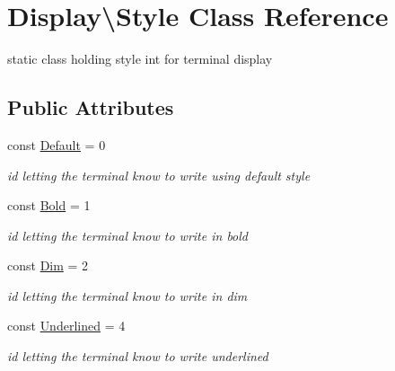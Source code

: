 \hypertarget{classDisplay_1_1Style}{}\section{Display\textbackslash{}Style Class Reference}
\label{classDisplay_1_1Style}


static class holding style int for terminal display  


\subsection*{Public Attributes}
\begin{DoxyCompactItemize}
\item 
\mbox{\label{classDisplay_1_1Style_a2c069acaa67c5efdd7821e4b2d71d472}} 
const \hyperlink{classDisplay_1_1Style_a2c069acaa67c5efdd7821e4b2d71d472}{Default} = 0
\begin{DoxyCompactList}\small\item\em id letting the terminal know to write using default style \end{DoxyCompactList}\item 
\mbox{\label{classDisplay_1_1Style_a26273dd8c98b09d0d7ffe0eef7583a87}} 
const \hyperlink{classDisplay_1_1Style_a26273dd8c98b09d0d7ffe0eef7583a87}{Bold} = 1
\begin{DoxyCompactList}\small\item\em id letting the terminal know to write in bold \end{DoxyCompactList}\item 
\mbox{\label{classDisplay_1_1Style_a78cb8aef7afff0bde92008d9a216e1c2}} 
const \hyperlink{classDisplay_1_1Style_a78cb8aef7afff0bde92008d9a216e1c2}{Dim} = 2
\begin{DoxyCompactList}\small\item\em id letting the terminal know to write in dim \end{DoxyCompactList}\item 
\mbox{\label{classDisplay_1_1Style_a381dbe5a47d442953744e252f2e1c2ec}} 
const \hyperlink{classDisplay_1_1Style_a381dbe5a47d442953744e252f2e1c2ec}{Underlined} = 4
\begin{DoxyCompactList}\small\item\em id letting the terminal know to write underlined \end{DoxyCompactList}\item 

\end{DoxyCompactItemize}
